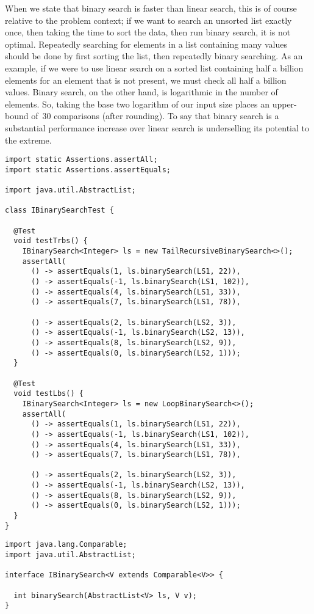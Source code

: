 When we state that binary search is faster than linear search, this is of course relative to the problem context; if we want to search an unsorted list exactly once, then taking the time to sort the data, then run binary search, it is not optimal. 
Repeatedly searching for elements in a list containing many values should be done by first sorting the list, then repeatedly binary searching. 
As an example, if we were to use linear search on a sorted list containing half a billion elements for an element that is not present, we must check all half a billion values. 
Binary search, on the other hand, is logarithmic in the number of elements. 
So, taking the base two logarithm of our input size places an upper-bound of~$30$ comparisons (after rounding). 
To say that binary search is a substantial performance increase over linear search is underselling its potential to the extreme.

\begin{lstlisting}[language=MyJava]
import static Assertions.assertAll;
import static Assertions.assertEquals;

import java.util.AbstractList;

class IBinarySearchTest {
  
  @Test
  void testTrbs() {
    IBinarySearch<Integer> ls = new TailRecursiveBinarySearch<>();
    assertAll(
      () -> assertEquals(1, ls.binarySearch(LS1, 22)),
      () -> assertEquals(-1, ls.binarySearch(LS1, 102)),
      () -> assertEquals(4, ls.binarySearch(LS1, 33)),
      () -> assertEquals(7, ls.binarySearch(LS1, 78)),

      () -> assertEquals(2, ls.binarySearch(LS2, 3)),
      () -> assertEquals(-1, ls.binarySearch(LS2, 13)),
      () -> assertEquals(8, ls.binarySearch(LS2, 9)),
      () -> assertEquals(0, ls.binarySearch(LS2, 1)));
  }
  
  @Test
  void testLbs() {
    IBinarySearch<Integer> ls = new LoopBinarySearch<>();
    assertAll(
      () -> assertEquals(1, ls.binarySearch(LS1, 22)),
      () -> assertEquals(-1, ls.binarySearch(LS1, 102)),
      () -> assertEquals(4, ls.binarySearch(LS1, 33)),
      () -> assertEquals(7, ls.binarySearch(LS1, 78)),

      () -> assertEquals(2, ls.binarySearch(LS2, 3)),
      () -> assertEquals(-1, ls.binarySearch(LS2, 13)),
      () -> assertEquals(8, ls.binarySearch(LS2, 9)),
      () -> assertEquals(0, ls.binarySearch(LS2, 1)));
  }
}
\end{lstlisting}

\begin{lstlisting}[language=MyJava]
import java.lang.Comparable;
import java.util.AbstractList;

interface IBinarySearch<V extends Comparable<V>> {
  
  int binarySearch(AbstractList<V> ls, V v);
}
\end{lstlisting}


